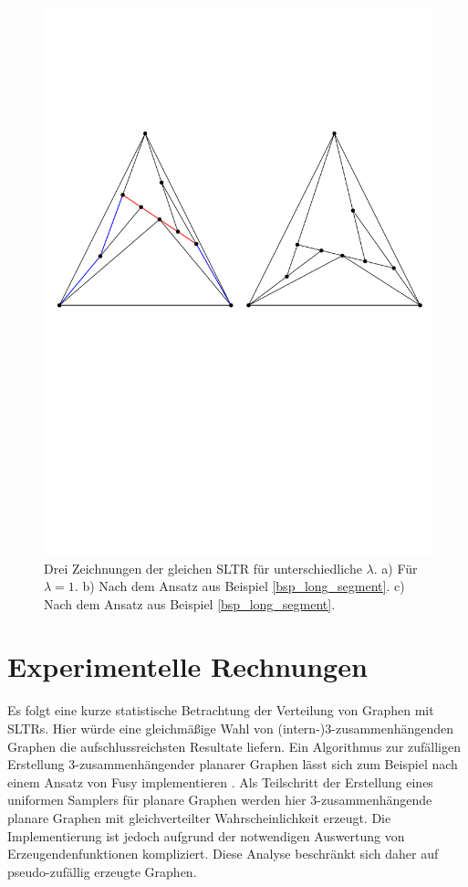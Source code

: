 \begin{figure}[h]
	\centering
  \includegraphics[width=1\textwidth]{example1_vis.pdf}
  \caption{Drei Zeichnungen der gleichen SLTR für unterschiedliche $\lambda$. a) Für $\lambda=1$. b) Nach dem Ansatz aus Beispiel \ref{bsp_long_segment}. c) Nach dem Ansatz aus Beispiel \ref{bsp_long_segment}.}
  \label{large_corner}
\end{figure}



\section{Experimentelle Rechnungen}\label{stats}

Es folgt eine kurze statistische Betrachtung der Verteilung von Graphen mit SLTRs. Hier würde eine gleichmäßige Wahl von (intern-)3-zusammenhängenden Graphen die aufschlussreichsten Resultate liefern. Ein Algorithmus zur zufälligen Erstellung 3-zusammenhängender planarer Graphen lässt sich zum Beispiel nach einem Ansatz von Fusy implementieren \cite{fusy09}. Als Teilschritt der Erstellung eines uniformen Samplers für planare Graphen werden hier 3-zusammenhängende planare Graphen mit gleichverteilter Wahrscheinlichkeit erzeugt. Die Implementierung ist jedoch aufgrund der notwendigen Auswertung von Erzeugendenfunktionen kompliziert. Diese Analyse beschränkt sich daher auf pseudo-zufällig erzeugte Graphen. 

